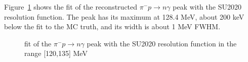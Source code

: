 Figure~\ref{figure:pipenu_bpip4b0s54r0100_murat_drpc_ana_t2_1_smom_1_fit} shows the fit of the
reconstructed $\pi^- p \to n \gamma$ peak with the SU2020 resolution function.
The peak has its maximum at 128.4 MeV, about 200 keV below the fit to the MC truth,
and its width is about 1 MeV FWHM. 

\begin{figure}[H]
  \caption{
    \label{figure:pipenu_bpip4b0s54r0100_murat_drpc_ana_t2_1_smom_1_fit}
    fit of the $\pi^- p \to n \gamma$ peak with the SU2020 resolution function
    in the range [120,135] MeV \\
  }
\end{figure}

